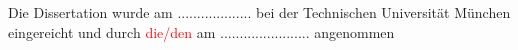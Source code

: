 \begin{tumtitlepage}
    
    
    

    \vspace{22pt}
    
    \noindent\fontsize{11pt}{25pt}\selectfont Die Dissertation wurde am ................... bei der Technischen Universität München eingereicht und durch \textcolor{red}{die/den} \department{} am ....................... angenommen
    
\end{tumtitlepage}